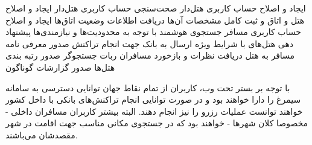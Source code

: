 
 ایجاد و اصلاح حساب کاربری هتل‌دار
 صحت‌سنجی حساب کاربری هتل‌دار
 ایجاد و اصلاح هتل و اتاق‌ و ثبت کامل مشخصات آن‌ها
 دریافت اطلاعات وضعیت اتاق‌ها
 ایجاد و اصلاح حساب کاربری مسافر
 جستجوی هوشمند با توجه به محدودیت‌ها و نیازمندی‌ها
 پیشنهاد دهی هتل‌های با شرایط ویژه
 ارسال به بانک جهت انجام تراکنش
 صدور معرفی نامه مسافر به هتل
 دریافت نظرات و بازخورد مسافران
 ربات جستجوگر
 صدور رتبه بندی هتل‌ها
 صدور گزارشات گوناگون

با توجه بر بستر تحت وب، کاربران از تمام نقاط جهان توانایی دسترسی به سامانه سیمرغ را دارا خواهند بود و در صورت توانایی انجام تراکنش‌های بانکی با داخل کشور خواهند توانست عملیات رزرو را نیز انجام دهند. البته بیشتر کاربران مسافران داخلی - مخصوصا کلان شهرها - خواهند بود که در جستجوی مکانی مناسب جهت اقامت در  شهر مقصدشان می‌باشند.